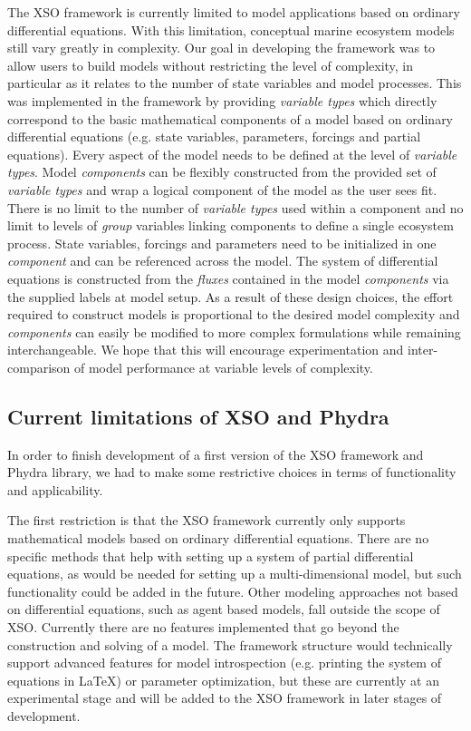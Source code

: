 \documentclass[journal abbreviation, manuscript]{copernicus}
\begin{document}
The XSO framework is currently limited to model applications based on ordinary differential equations. With this limitation, conceptual marine ecosystem models still vary greatly in complexity. Our goal in developing the framework was to allow users to build models without restricting the level of complexity, in particular as it relates to the number of state variables and model processes. This was implemented in the framework by providing \textit{variable types} which directly correspond to the basic mathematical components of a model based on ordinary differential equations (e.g. state variables, parameters, forcings and partial equations). Every aspect of the model needs to be defined at the level of \textit{variable types}. Model \textit{components} can be flexibly constructed from the provided set of \textit{variable types} and wrap a logical component of the model as the user sees fit. There is no limit to the number of \textit{variable types} used within a component and no limit to levels of \textit{group} variables linking components to define a single ecosystem process. State variables, forcings and parameters need to be initialized in one \textit{component} and can be referenced across the model. The system of differential equations is constructed from the \textit{fluxes} contained in the model \textit{components} via the supplied labels at model setup. As a result of these design choices, the effort required to construct models is proportional to the desired model complexity and \textit{components} can easily be modified to more complex formulations while remaining interchangeable. We hope that this will encourage experimentation and inter-comparison of model performance at variable levels of complexity. 


\subsection{Current limitations of XSO and Phydra}
In order to finish development of a first version of the XSO framework and Phydra library, we had to make some restrictive choices in terms of functionality and applicability.

The first restriction is that the XSO framework currently only supports mathematical models based on ordinary differential equations. There are no specific methods that help with setting up a system of partial differential equations, as would be needed for setting up a multi-dimensional model, but such functionality could be added in the future. Other modeling approaches not based on differential equations, such as agent based models, fall outside the scope of XSO. Currently there are no features implemented that go beyond the construction and solving of a model. The framework structure would technically support advanced features for model introspection (e.g. printing the system of equations in LaTeX) or parameter optimization, but these are currently at an experimental stage and will be added to the XSO framework in later stages of development.
\end{document}
